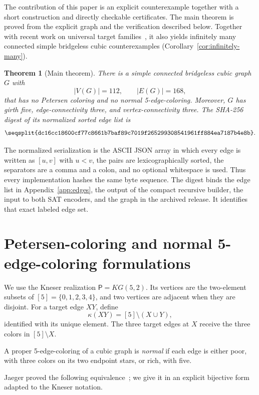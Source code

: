 \documentclass[11pt]{article}
\newtheorem{theorem}{Theorem}[section]
\newcommand{\Petersen}{\mathsf P}
\newcommand{\sha}[1]{\texttt{\seqsplit{#1}}}
\begin{document}
The contribution of this paper is an explicit counterexample together with a
short construction and directly checkable certificates.  The main theorem is
proved from the explicit graph and the verification described below.  Together
with recent work on universal target families~\cite{MaEtAl2025}, it also yields
infinitely many connected simple bridgeless cubic counterexamples
(Corollary~\ref{cor:infinitely-many}).

\begin{theorem}[Main theorem]\label{thm:main}
There is a simple connected bridgeless cubic graph \(G\) with
\[
  |V(G)|=112,\qquad |E(G)|=168,
\]
that has no Petersen coloring and no normal 5-edge-coloring.  Moreover,
\(G\) has girth five, edge-connectivity three, and vertex-connectivity three.
The SHA-256 digest of its normalized sorted edge list is
\[
\sha{dc16cc18600cf77c8661b7baf89c7019f265299308541961ff884ea7187b4e8b}.
\]
\end{theorem}

The normalized serialization is the ASCII JSON array in which every edge is
written as \([u,v]\) with \(u<v\), the pairs are lexicographically sorted,
the separators are a comma and a colon, and no optional whitespace is used.
Thus every implementation hashes the same byte sequence.  The digest binds
the edge list in Appendix~\ref{app:edges}, the output of the compact recursive
builder, the input to both SAT encoders, and the graph in the archived release.
It identifies that exact labeled edge set.

\section{Petersen-coloring and normal 5-edge-coloring formulations}\label{sec:equivalence}

We use the Kneser realization \(\Petersen=KG(5,2)\).  Its vertices are the
two-element subsets of \([5]=\{0,1,2,3,4\}\), and two vertices are adjacent
when they are disjoint.  For a target edge \(XY\), define
\[
  \kappa(XY)=[5]\setminus(X\cup Y),
\]
identified with its unique element.  The three target edges at \(X\) receive
the three colors in \([5]\setminus X\).

A proper 5-edge-coloring of a cubic graph is \emph{normal} if each edge is
either poor, with three colors on its two endpoint stars, or rich, with five.

Jaeger proved the following equivalence~\cite{Jaeger1985}; we give it in an
explicit bijective form adapted to the Kneser notation.
\end{document}
